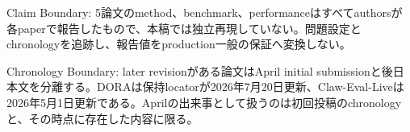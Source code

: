 \begin{claimboundary}
Claim Boundary: 5論文のmethod、benchmark、performanceはすべてauthorsが各paperで報告したもので、本稿では独立再現していない。問題設定とchronologyを追跡し、報告値をproduction一般の保証へ変換しない。\autocite{src-0d99a9f2485e,src-56e226358d6f,src-6bd60c76cba7,src-841d4b563b9d,src-8e578daed9ed}
\end{claimboundary}

\begin{claimboundary}
Chronology Boundary: later revisionがある論文はApril initial submissionと後日本文を分離する。DORAは保持locatorが2026年7月20日更新、Claw-Eval-Liveは2026年5月1日更新である。Aprilの出来事として扱うのは初回投稿のchronologyと、その時点に存在した内容に限る。\autocite{src-6bd60c76cba7,src-841d4b563b9d}
\end{claimboundary}
